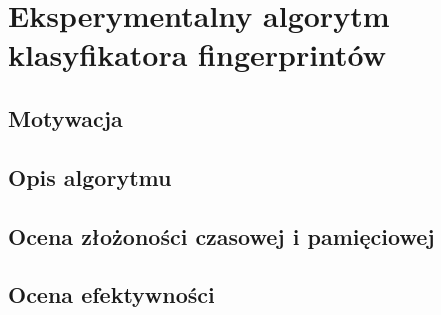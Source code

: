 \chapter{Eksperymentalny algorytm klasyfikatora fingerprintów}

\section{Motywacja}

\section{Opis algorytmu}

\section{Ocena złożoności czasowej i pamięciowej}

\section{Ocena efektywności}
